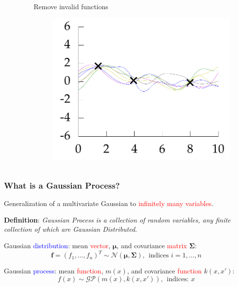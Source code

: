 \documentclass[10pt]{beamer}
\newcommand{\gp}{\mathcal{GP}}
\newcommand{\gaussN}{\mathcal{N}}
\newcommand{\bmu}{\boldsymbol{\mu}}
\newcommand{\bSig}{\boldsymbol{\Sigma}}
\begin{document}
\begin{frame}
\begin{columns}
\begin{column}{0.33\textwidth}
\begin{figure}
        \end{figure}
      \end{column}
      \pause
      \begin{column}{0.33\textwidth}
        Remove invalid functions
        \begin{figure}
          \centering
          \includegraphics[width=\textwidth]{func3.png}
        \end{figure}
      \end{column}
    \end{columns}
  \end{frame}

  \begin{frame}
    \frametitle{What is a Gaussian Process?}
    Generalization of a multivariate Gaussian to \textcolor{red}{infinitely many variables}.

    \begin{block}{}
      \textbf{Definition}: \emph{Gaussian Process is a collection of random variables, any finite collection of which are Gaussian Distributed.}
    \end{block}

    Gaussian \textcolor{blue}{distribution}: mean \textcolor{red}{vector}, $\bmu$, and covariance \textcolor{red}{matrix} $\bSig$:
    \begin{equation*}
      \mathbf{f} = (f_1,\dots,f_n)^T \sim \gaussN(\bmu,\bSig),~~\text{indices } i = 1,\dots,n
    \end{equation*}

    Gaussian \textcolor{blue}{process}: mean \textcolor{red}{function}, $m(x)$, and covariance \textcolor{red}{function} $k(x,x')$:
    \begin{equation*}
      f(x) \sim \gp(m(x),k(x,x')),~~\text{indices: } x
    \end{equation*}
  \end{frame}
\end{document}
